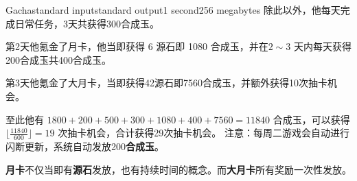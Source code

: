 \documentclass[12pt,a4paper,oneside]{article}
\begin{document}
\begin{problem}{Gacha}{standard input}{standard output}{1 second}{256 megabytes}
    除此以外，他每天完成日常任务，3天共获得300合成玉。
    
    第2天他氪金了月卡，他当即获得 6 源石即 1080 合成玉，并在$2 \sim 3$ 天内每天获得200合成玉共400合成玉。

    第3天他氪金了大月卡，当即获得42源石即7560合成玉，并额外获得10次抽卡机会。


    至此他有 $1800+200+500+300+1080+400+7560=11840$ 合成玉，可以获得$\lfloor \frac{11840}{600} \rfloor = 19$ 次抽卡机会，合计获得29次抽卡机会。
    \Note
    注意：每周二游戏会自动进行闪断更新，系统自动发放200\textbf{合成玉}。

    \textbf{月卡}不仅当即有\textbf{源石}发放，也有持续时间的概念。而\textbf{大月卡}所有奖励一次性发放。
    \end{problem}

\end{document}
